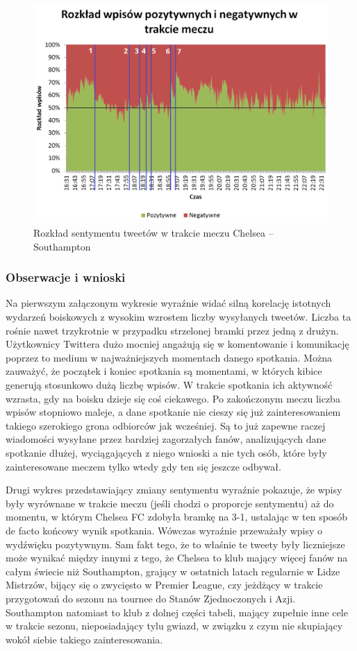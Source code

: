 \begin{figure}[ht!]
\centering
\includegraphics[width=140mm]{img/sentyment-w-meczu-nums-50percentage.png}
\caption{Rozkład sentymentu tweetów w trakcie meczu Chelsea -- Southampton}
\label{image:sentyment-w-meczu}
\end{figure}


\subsubsection{Obserwacje i wnioski}
Na pierwszym załączonym wykresie wyraźnie widać silną korelację istotnych
wydarzeń boiskowych z wysokim wzrostem liczby wysyłanych tweetów. 
Liczba ta rośnie nawet trzykrotnie w przypadku strzelonej bramki przez jedną
z drużyn. Użytkownicy Twittera dużo mocniej angażują się w komentowanie i 
komunikację poprzez to medium w najważniejszych momentach danego spotkania.
Można zauważyć, że początek i koniec spotkania są momentami, w których
kibice generują stosunkowo dużą liczbę wpisów. W trakcie spotkania
ich aktywność wzrasta, gdy na boisku dzieje się coś ciekawego.
Po zakończonym meczu liczba wpisów stopniowo maleje, a dane spotkanie
nie cieszy się już zainteresowaniem takiego szerokiego grona
odbiorców jak wcześniej. Są to już zapewne raczej wiadomości wysyłane
przez bardziej zagorzałych fanów, analizujących dane spotkanie dłużej,
wyciągających z niego wnioski a nie tych osób, które były zainteresowane
meczem tylko wtedy gdy ten się jeszcze odbywał.

Drugi wykres przedstawiający zmiany sentymentu wyraźnie pokazuje, że wpisy były
wyrównane w trakcie meczu (jeśli chodzi o proporcje sentymentu) aż do momentu,
w którym Chelsea FC zdobyła bramkę na 3-1, ustalając w ten sposób de facto
końcowy wynik spotkania. Wówczas wyraźnie przeważały wpisy o wydźwięku
pozytywnym. Sam fakt tego, że to właśnie te tweety były liczniejsze może wynikać
między innymi z tego, że Chelsea to klub mający więcej fanów na całym świecie
niż Southampton, grający w ostatnich latach regularnie w Lidze Mistrzów, bijący
się o zwycięsto w Premier League, czy jeżdżący w trakcie przygotowań do sezonu
na tournee do Stanów Zjednoczonych i Azji. Southampton natomiast to klub z dolnej
części tabeli, mający zupełnie inne cele w trakcie sezonu, nieposiadający tylu
gwiazd, w związku z czym nie skupiający wokół siebie takiego zainteresowania.

